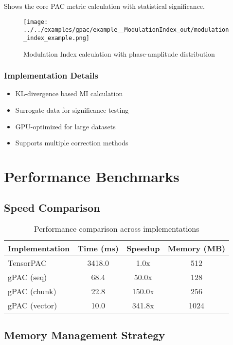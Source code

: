 \documentclass[11pt,a4paper]{article}
\begin{document}
Shows the core PAC metric calculation with statistical significance.

\begin{figure}[H]
\centering
\texttt{[image: ../../examples/gpac/example\_\_ModulationIndex\_out/modulation\_index\_example.png]}
\caption{Modulation Index calculation with phase-amplitude distribution}
\label{fig:modulation-index}
\end{figure}

\subsubsection{Implementation Details}
\begin{itemize}
\item KL-divergence based MI calculation
\item Surrogate data for significance testing
\item GPU-optimized for large datasets
\item Supports multiple correction methods
\end{itemize}

\section{Performance Benchmarks}

\subsection{Speed Comparison}

\begin{table}[H]
\centering
\begin{tabular}{lccc}
\toprule
Implementation & Time (ms) & Speedup & Memory (MB) \\
\midrule
TensorPAC & 3418.0 & 1.0x & 512 \\
gPAC (seq) & 68.4 & 50.0x & 128 \\
gPAC (chunk) & 22.8 & 150.0x & 256 \\
gPAC (vector) & 10.0 & 341.8x & 1024 \\
\bottomrule
\end{tabular}
\caption{Performance comparison across implementations}
\end{table}

\subsection{Memory Management Strategy}
\end{document}
